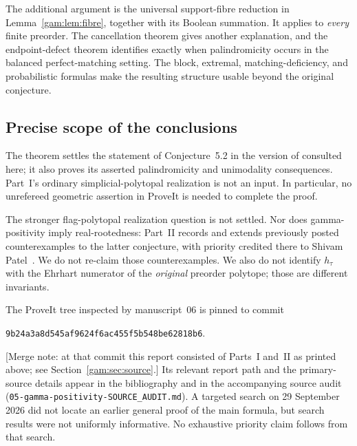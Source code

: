 \documentclass[11pt]{article}
\numberwithin{equation}{section}
\theoremstyle{definition}
\begin{document}
The additional argument is the universal support-fibre reduction in
Lemma~\ref{gam:lem:fibre}, together with its Boolean summation. It applies to
\emph{every} finite preorder. The cancellation theorem gives another
explanation, and the endpoint-defect theorem identifies exactly when
palindromicity occurs in the balanced perfect-matching setting. The block,
extremal, matching-deficiency, and probabilistic formulas make the resulting
structure usable beyond the original conjecture.

\subsection{Precise scope of the conclusions}
The theorem settles the statement of Conjecture~5.2 in the version of
\cite{AC} consulted here; it also proves its asserted palindromicity and
unimodality consequences. Part~I's ordinary simplicial-polytopal
realization is not an input. In particular, no unrefereed geometric assertion
in ProveIt is needed to complete the proof.

The stronger flag-polytopal realization question is not settled. Nor does
gamma-positivity imply real-rootedness: Part~II records and extends
previously posted counterexamples to the latter conjecture, with priority
credited there to Shivam Patel~\cite{Patel}. We do not re-claim those
counterexamples. We also do not identify $h_\tau$ with the Ehrhart numerator
of the \emph{original} preorder polytope; those are different invariants.

The ProveIt tree inspected by manuscript~06 is pinned to commit
\begin{center}
\small\texttt{9b24a3a8d545af9624f6ac455f5b548be62818b6}.
\end{center}
[Merge note: at that commit this report consisted of Parts~I and~II as
printed above; see Section~\ref{gam:sec:source}.] Its relevant report path
and the primary-source details appear in the bibliography and in the
accompanying source audit (\texttt{05-gamma-positivity-SOURCE\_AUDIT.md}). A
targeted search on 29 September 2026 did not locate an earlier general proof
of the main formula, but search results were not uniformly informative. No
exhaustive priority claim follows from that search.
\end{document}
